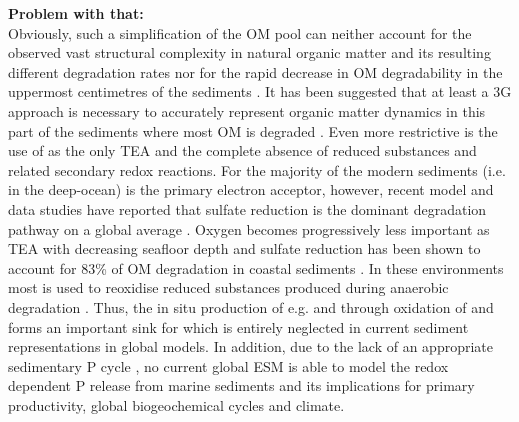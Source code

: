 \documentclass[gmd, manuscript]{copernicus}
\begin{document}
\textbf{Problem with that:} \\
Obviously, such a simplification of the OM pool can neither account for the observed vast structural complexity in natural organic matter and its resulting different degradation 
rates nor for the rapid decrease in OM degradability in the uppermost centimetres of the sediments \citep{arndt_quantifying_2013}. It has been suggested that at least a 3G approach 
is necessary to accurately represent organic matter dynamics in this part of the sediments where most OM is degraded \citep[e.g.][]{soetaert_model_1996}. 
Even more restrictive is the use of  as the only TEA and the complete absence of reduced substances and related secondary redox reactions. 
For the majority of the modern sediments (i.e. in the deep-ocean)  is the primary electron acceptor, %
however, recent model and data studies have reported that sulfate reduction is the dominant degradation pathway on a global average 
\citep[with contributions of 55-76\%][]{canfield_aquatic_2005, jorgensen_sulfur_2006, thullner_global_scale_2009}. 
Oxygen becomes progressively less important as TEA with decreasing seafloor depth and sulfate reduction has been shown to account for 83\% of OM degradation in coastal sediments \citep{krumins_dissolved_2013}. 
In these environments most  is used to reoxidise reduced substances produced during anaerobic degradation \citep{canfield_aquatic_2005, thullner_global_scale_2009}. 
Thus, the in situ production of e.g.  and  through oxidation of  and  forms an important sink for  which is entirely neglected in 
current sediment representations in global models. In addition, due to the lack of an appropriate sedimentary P cycle \citep[with the exception of the HAMOCC version of,][]{palastanga_long_term_2011}, no current global ESM is able to model 
the redox dependent P release from marine sediments and its implications for primary productivity, global biogeochemical cycles and climate. 

\end{document}
